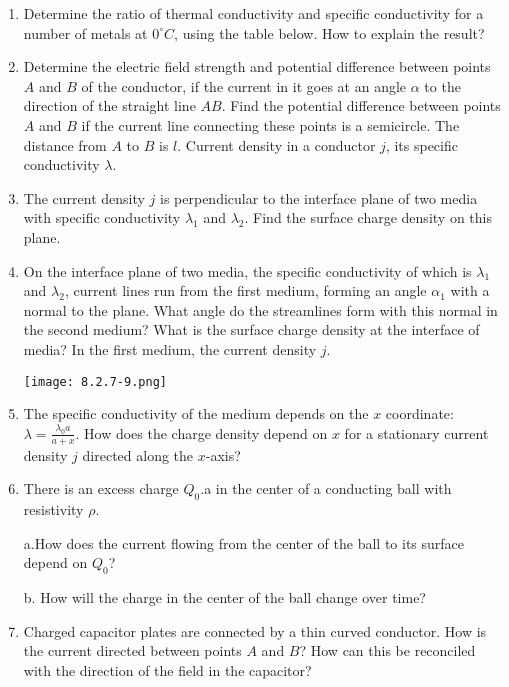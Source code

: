 \documentclass{article}
\begin{document}
\begin{enumerate}[label=8.2.\arabic*]
\item Determine the ratio of thermal conductivity and specific conductivity for a number of metals at $0^\circ C$, using the table below. How to explain the result? 

\item Determine the electric field strength and potential difference between points $A$ and $B$ of the conductor, if the current in it goes at an angle $\alpha$ to the direction of the straight line $AB$. Find the potential difference between points $A$ and $B$ if the current line connecting these points is a semicircle. The distance from $A$ to $B$ is $l$. Current density in a conductor $j$, its specific conductivity $\lambda$.

\item The current density $j$ is perpendicular to the interface plane of two media with specific conductivity $\lambda_1$ and $\lambda_2$. Find the surface charge density on this plane.

\item On the interface plane of two media, the specific conductivity of which is $\lambda_1$ and $\lambda_2$, current lines run from the first medium, forming an angle $\alpha_1$ with a normal to the plane. What angle do the streamlines form with this normal in the second medium? What is the surface charge density at the interface of media? In the first medium, the current density $j$.

\begin{center}
    \texttt{[image: 8.2.7-9.png]}
\end{center}


\item The specific conductivity of the medium depends on the $x$ coordinate: $\lambda = \frac{\lambda_0 a}{a+ x}$. How does the charge density depend on $x$ for a stationary current density $j$ directed along the $x$-axis?

\item There is an excess charge $Q_0$.a in the center of a conducting ball with resistivity $\rho$. 

a.How does the current flowing from the center of the ball to its surface depend on $Q_0$? 

b. How will the charge in the center of the ball change over time?

\item Charged capacitor plates are connected by a thin curved conductor. How is the current directed between points $A$ and $B$? How can this be reconciled with the direction of the field in the capacitor?


\end{enumerate}
\end{document}
